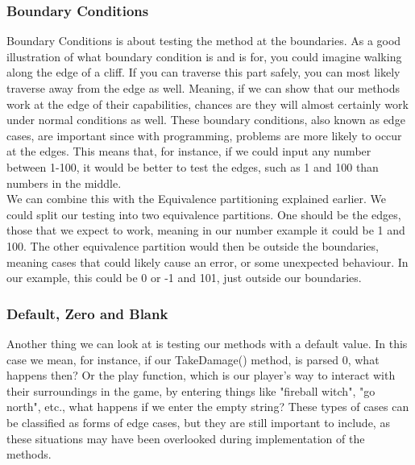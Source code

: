 \subsubsection{Boundary Conditions}
Boundary Conditions is about testing the method at the boundaries. As a good illustration of what boundary condition is and is for, you could imagine walking along the edge of a cliff. If you can traverse this part safely, you can most likely traverse away from the edge as well. Meaning, if we can show that our methods work at the edge of their capabilities, chances are they will almost certainly work under normal conditions as well. These boundary conditions, also known as edge cases, are important since with programming, problems are more likely to occur at the edges\cite{TestingBlackbox}. This means that, for instance, if we could input any number between 1-100, it would be better to test the edges, such as 1 and 100 than numbers in the middle. \\
We can combine this with the Equivalence partitioning explained earlier. We could split our testing into two equivalence partitions. One should be the edges, those that we expect to work, meaning in our number example it could be 1 and 100. The other equivalence partition would then be outside the boundaries, meaning cases that could likely cause an error, or some unexpected behaviour. In our example, this could be 0 or -1 and 101, just outside our boundaries. 
\subsubsection{Default, Zero and Blank}
Another thing we can look at is testing our methods with a default value. In this case we mean, for instance, if our TakeDamage() method, is parsed 0, what happens then? Or the play function, which is our player's way to interact with their surroundings in the game, by entering things like "fireball witch", "go north", etc., what happens if we enter the empty string? These types of cases can be classified as forms of edge cases, but  they are still important to include, as these situations may have been overlooked during implementation of the methods\cite{TestingBlackbox}.
